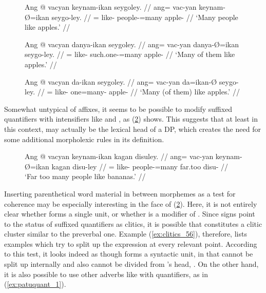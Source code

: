 \begin{figure}
\pex\label{ex:clitics_54}
\a\label{ex:clitics_54a}\begingl
	\gla Ang @ vacyan keynam-ikan seygoley. //
	\glb ang= vac-yan keynam-Ø=ikan seygo-ley. //
	\glc \AgtT{}= like-\TplM{} people-\Top{}=many apple-\PargI{} //
	\glft `Many people like apples.' //
\endgl

\a\label{ex:clitics_54b}\begingl
	\gla Ang @ vacyan danya-ikan seygoley. //
	\glb ang= vac-yan danya-Ø=ikan seygo-ley. //
	\glc \AgtT{}= like-\TplM{} such.one-\Top{}=many apple-\PargI{} //
	\glft `Many of them like apples.' //
\endgl

\a\label{ex:clitics_54c}\begingl
	\gla Ang @ vacyan da-ikan seygoley. //
	\glb ang= vac-yan da=ikan-Ø seygo-ley. //
	\glc \AgtT{}= like-\TplM{} one=many-\Top{} apple-\PargI{} //
	\glft `Many (of them) like apples.' //
\endgl
\xe
\end{figure}

Somewhat untypical of affixes, it seems to be possible to modify suffixed
quantifiers with intensifiers like  and
, as (\ref{ex:clitics_55}) shows. This suggests
that at least in this context,  may
actually be the lexical head of a DP, which creates the need for
some additional morpholexic rules in its definition.

\begin{figure}
\ex\label{ex:clitics_55}\begingl
	\gla Ang @ vacyan keynam-ikan kagan disuley. //
	\glb ang= vac-yan keynam-Ø=ikan kagan disu-ley //
	\glc \AgtT{}= like-\TplM{} people-\Top{}=many far.too disu-\PargI{} //
	\glft `Far too many people like bananas.' //
\endgl\xe
\end{figure}

Inserting parenthetical word material in between morphemes as a test for
coherence may be especially interesting in the face of (\ref{ex:clitics_55}).
Here, it is not entirely clear whether  forms a single unit, or whether  is a modifier of . Since signs
point to the status of suffixed quantifiers as clitics, it is possible that
 constitutes a clitic cluster
similar to the preverbal one. Example (\ref{ex:clitics_56}), therefore, lists
examples which try to split up the expression at every relevant point. According
to this test, it looks indeed as though  forms a syntactic unit, in that  cannot be
split up internally and also cannot be divided from 's head,
. On the other hand, it is also possible to use
other adverbs like  with
quantifiers, as in (\ref{ex:patuquant_1}).


